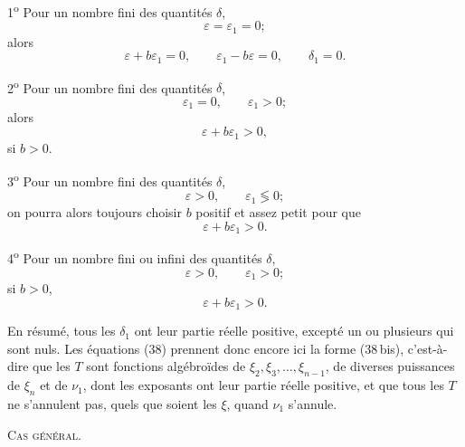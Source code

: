 \documentclass[11pt]{article}
\begin{document}
1\textsuperscript{o} Pour un nombre fini des quantités $\delta$,
\[
\varepsilon=\varepsilon_1=0;
\]
alors
\[
\varepsilon+b\varepsilon_1=0,
\qquad
\varepsilon_1-b\varepsilon=0,
\qquad
\delta_1=0.
\]

2\textsuperscript{o} Pour un nombre fini des quantités $\delta$,
\[
\varepsilon_1=0,
\qquad
\varepsilon_1>0;
\]
alors
\[
\varepsilon+b\varepsilon_1>0,
\]
si $b>0$.

3\textsuperscript{o} Pour un nombre fini des quantités $\delta$,
\[
\varepsilon>0,
\qquad
\varepsilon_1\lessgtr 0;
\]
on pourra alors toujours choisir $b$ positif et assez petit pour que
\[
\varepsilon+b\varepsilon_1>0.
\]

4\textsuperscript{o} Pour un nombre fini ou infini des quantités $\delta$,
\[
\varepsilon>0,
\qquad
\varepsilon_1>0;
\]
si $b>0$,
\[
\varepsilon+b\varepsilon_1>0.
\]

En résumé, tous les $\delta_1$ ont leur partie réelle positive, excepté un ou plusieurs qui sont nuls. Les équations (38) prennent donc encore ici la forme (38\,bis), c’est-à-dire que les $T$ sont fonctions algébroïdes de $\xi_2,\xi_3,\ldots,\xi_{n-1}$, de diverses puissances de $\xi_n$ et de $\nu_1$, dont les exposants ont leur partie réelle positive, et que tous les $T$ ne s’annulent pas, quels que soient les $\xi$, quand $\nu_1$ s’annule.

\begin{center}
{\scshape Cas général.}
\end{center}
\end{document}
